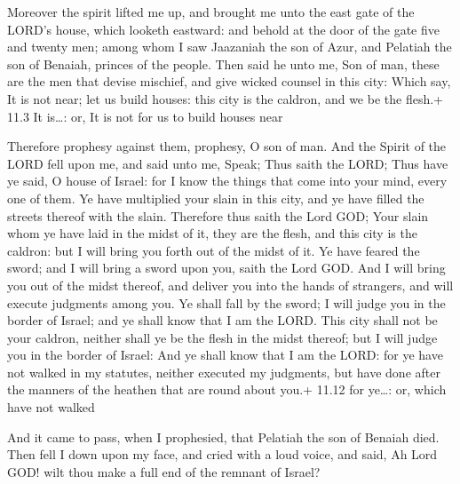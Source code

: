  Moreover the spirit lifted me up, and brought me unto the
east gate of the LORD's house, which looketh eastward: and behold at the
door of the gate five and twenty men; among whom I saw Jaazaniah the son
of Azur, and Pelatiah the son of Benaiah, princes of the people.
 Then said he unto me, Son of man, these are the men that
devise mischief, and give wicked counsel in this city: 
Which say, It is not near; let us build houses: this city is the
caldron, and we be the flesh.+ 11.3 It is\ldots: or, It is not for us to
build houses near

 Therefore prophesy against them, prophesy, O son of man.
 And the Spirit of the LORD fell upon me, and said unto me,
Speak; Thus saith the LORD; Thus have ye said, O house of Israel: for I
know the things that come into your mind, every one of them.
 Ye have multiplied your slain in this city, and ye have
filled the streets thereof with the slain.  Therefore thus
saith the Lord GOD; Your slain whom ye have laid in the midst of it,
they are the flesh, and this city is the caldron: but I will bring you
forth out of the midst of it.  Ye have feared the sword; and
I will bring a sword upon you, saith the Lord GOD.  And I
will bring you out of the midst thereof, and deliver you into the hands
of strangers, and will execute judgments among you.  Ye
shall fall by the sword; I will judge you in the border of Israel; and
ye shall know that I am the LORD.  This city shall not be
your caldron, neither shall ye be the flesh in the midst thereof; but I
will judge you in the border of Israel:  And ye shall know
that I am the LORD: for ye have not walked in my statutes, neither
executed my judgments, but have done after the manners of the heathen
that are round about you.+ 11.12 for ye\ldots: or, which have not walked

 And it came to pass, when I prophesied, that Pelatiah
the son of Benaiah died. Then fell I down upon my face, and cried with a
loud voice, and said, Ah Lord GOD! wilt thou make a full end of the
remnant of Israel?

